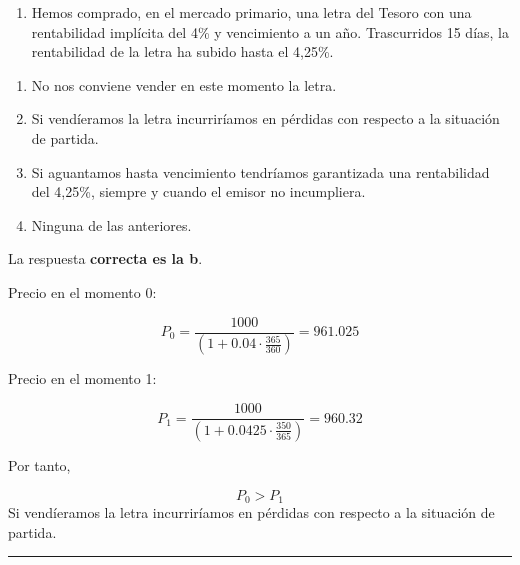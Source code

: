 \documentclass[
  letterpaper,
  DIV=11,
  numbers=noendperiod]{scrreprt}
\providecommand{\tightlist}{%
  \setlength{\itemsep}{0pt}\setlength{\parskip}{0pt}}\usepackage{longtable,booktabs,array}
\begin{document}
\begin{enumerate}
\def\labelenumi{\arabic{enumi}.}
\setcounter{enumi}{19}
\tightlist
\item
  Hemos comprado, en el mercado primario, una letra del Tesoro con una
  rentabilidad implícita del 4\% y vencimiento a un año. Trascurridos 15
  días, la rentabilidad de la letra ha subido hasta el 4,25\%.
\end{enumerate}

\begin{enumerate}
\def\labelenumi{\alph{enumi}.}
\item
  No nos conviene vender en este momento la letra.
\item
  Si vendíeramos la letra incurriríamos en pérdidas con respecto a la
  situación de partida.
\item
  Si aguantamos hasta vencimiento tendríamos garantizada una
  rentabilidad del 4,25\%, siempre y cuando el emisor no incumpliera.
\item
  Ninguna de las anteriores.
\end{enumerate}

\begin{tcolorbox}[enhanced jigsaw, left=2mm, opacityback=0, colback=white, breakable, arc=.35mm, bottomrule=.15mm, rightrule=.15mm, toprule=.15mm, leftrule=.75mm, colframe=quarto-callout-tip-color-frame]
\begin{minipage}[t]{5.5mm}
\textcolor{quarto-callout-tip-color}{\faLightbulb}
\end{minipage}%
\begin{minipage}[t]{\textwidth - 5.5mm}

La respuesta \textbf{correcta es la b}.

Precio en el momento 0:

\[P_0=\frac{1000}{\left(1+0.04\cdot\frac{365}{360}\right)}=961.025\]

Precio en el momento 1:

\[P_1=\frac{1000}{\left(1+0.0425\cdot\frac{350}{365}\right)}=960.32\]

Por tanto,

\[P_0>P_1\] Si vendíeramos la letra incurriríamos en pérdidas con
respecto a la situación de partida.

\end{minipage}%
\end{tcolorbox}

\begin{center}\rule{0.5\linewidth}{0.5pt}\end{center}
\end{document}
